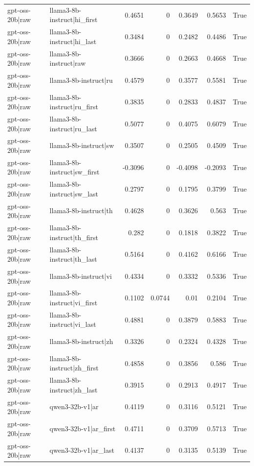 \begin{table}
\begin{tabular}{l l r r r r l}
gpt-oss-20b|raw & llama3-8b-instruct|hi_first & 0.4651 & 0 & 0.3649 & 0.5653 & True \\
gpt-oss-20b|raw & llama3-8b-instruct|hi_last & 0.3484 & 0 & 0.2482 & 0.4486 & True \\
gpt-oss-20b|raw & llama3-8b-instruct|raw & 0.3666 & 0 & 0.2663 & 0.4668 & True \\
gpt-oss-20b|raw & llama3-8b-instruct|ru & 0.4579 & 0 & 0.3577 & 0.5581 & True \\
gpt-oss-20b|raw & llama3-8b-instruct|ru_first & 0.3835 & 0 & 0.2833 & 0.4837 & True \\
gpt-oss-20b|raw & llama3-8b-instruct|ru_last & 0.5077 & 0 & 0.4075 & 0.6079 & True \\
gpt-oss-20b|raw & llama3-8b-instruct|sw & 0.3507 & 0 & 0.2505 & 0.4509 & True \\
gpt-oss-20b|raw & llama3-8b-instruct|sw_first & -0.3096 & 0 & -0.4098 & -0.2093 & True \\
gpt-oss-20b|raw & llama3-8b-instruct|sw_last & 0.2797 & 0 & 0.1795 & 0.3799 & True \\
gpt-oss-20b|raw & llama3-8b-instruct|th & 0.4628 & 0 & 0.3626 & 0.563 & True \\
gpt-oss-20b|raw & llama3-8b-instruct|th_first & 0.282 & 0 & 0.1818 & 0.3822 & True \\
gpt-oss-20b|raw & llama3-8b-instruct|th_last & 0.5164 & 0 & 0.4162 & 0.6166 & True \\
gpt-oss-20b|raw & llama3-8b-instruct|vi & 0.4334 & 0 & 0.3332 & 0.5336 & True \\
gpt-oss-20b|raw & llama3-8b-instruct|vi_first & 0.1102 & 0.0744 & 0.01 & 0.2104 & True \\
gpt-oss-20b|raw & llama3-8b-instruct|vi_last & 0.4881 & 0 & 0.3879 & 0.5883 & True \\
gpt-oss-20b|raw & llama3-8b-instruct|zh & 0.3326 & 0 & 0.2324 & 0.4328 & True \\
gpt-oss-20b|raw & llama3-8b-instruct|zh_first & 0.4858 & 0 & 0.3856 & 0.586 & True \\
gpt-oss-20b|raw & llama3-8b-instruct|zh_last & 0.3915 & 0 & 0.2913 & 0.4917 & True \\
gpt-oss-20b|raw & qwen3-32b-v1|ar & 0.4119 & 0 & 0.3116 & 0.5121 & True \\
gpt-oss-20b|raw & qwen3-32b-v1|ar_first & 0.4711 & 0 & 0.3709 & 0.5713 & True \\
gpt-oss-20b|raw & qwen3-32b-v1|ar_last & 0.4137 & 0 & 0.3135 & 0.5139 & True \\

\end{tabular}
\end{table}
